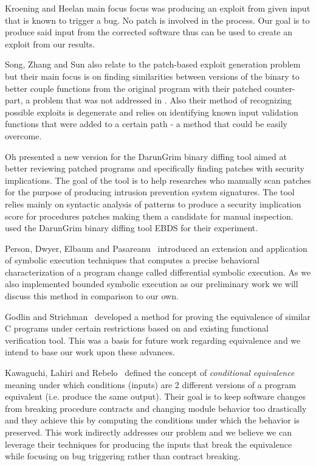 Kroening and Heelan \cite{AutoExploit} main focus focus was producing an exploit from given input that is known to trigger a bug. No patch is involved in the process. Our
goal is to produce said input from the corrected software thus \cite{AutoExploit} can be used to create an exploit from our results.

Song, Zhang and Sun \cite{AutoBinary} also relate to the patch-based exploit generation problem but their main focus is on finding similarities between versions of the binary to better couple functions from the original program with their patched counter-part, a problem that was not addressed in \cite{AutoPatch}. Also their method of recognizing possible exploits is degenerate and relies on identifying known input validation functions that were added to a certain path - a method that could be easily overcome.

Oh \cite{DarunGrim3} presented a new version for the DarunGrim binary diffing tool aimed at better reviewing patched programs and specifically finding patches with security implications. The goal of the tool is to help researches who manually scan patches for the purpose of producing intrusion prevention system signatures. The tool relies mainly on syntactic analysis of patterns to produce a security implication score for procedures patches making them a candidate for manual inspection. \cite{AutoPatch} used the DarunGrim binary diffing tool EBDS for their experiment.

Person, Dwyer, Elbaum and Pasareanu~\cite{DEP:FSE08} introduced an extension and
application of symbolic execution techniques that computes a
precise behavioral characterization of a program change called
differential symbolic execution. As we also implemented bounded
symbolic execution as our preliminary work we will discuss this
method in comparison to our own.

Godlin and Strichman~\cite{DBLP:conf/dac/GodlinS09} developed a
method for proving the equivalence of similar C programs under
certain restrictions based on and existing functional verification
tool. This was a basis for future work regarding equivalence and
we intend to base our work upon these advances.

Kawaguchi, Lahiri and Rebelo~\cite{CondEqv} defined the concept of
\textit{conditional equivalence} meaning under which conditions
(inputs) are 2 different versions of a program equivalent (i.e.
produce the same output). Their goal is to keep software changes
from breaking procedure contracts and changing module behavior too
drastically and they achieve this by computing the conditions
under which the behavior is preserved. This work indirectly
addresses our problem and we believe we can leverage their
techniques for producing the inputs that break the equivalence
while focusing on bug triggering rather than contract breaking.



